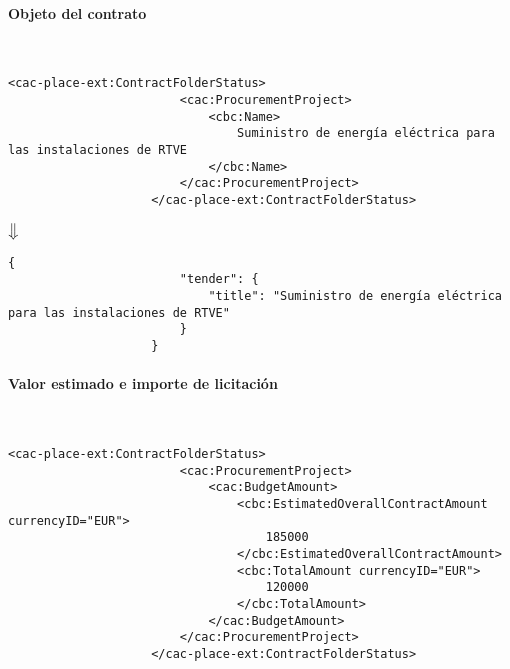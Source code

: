             \paragraph{Objeto del contrato} \mbox{}\\
                \begin{lstlisting}[language=lXML]
                    <cac-place-ext:ContractFolderStatus>
                        <cac:ProcurementProject>
                            <cbc:Name>
                                Suministro de energía eléctrica para las instalaciones de RTVE
                            </cbc:Name>
                        </cac:ProcurementProject>
                    </cac-place-ext:ContractFolderStatus>
                \end{lstlisting}
                
                \begin{center}
                    $\big\Downarrow$
                \end{center}
                
                \begin{lstlisting}[language=lJSON]
                    {
                        "tender": {
                            "title": "Suministro de energía eléctrica para las instalaciones de RTVE"
                        }
                    }
                \end{lstlisting}
                
            \paragraph{Valor estimado e importe de licitación} \mbox{}\\
                \begin{lstlisting}[language=lXML]
                    <cac-place-ext:ContractFolderStatus>
                        <cac:ProcurementProject>
                            <cac:BudgetAmount>
                                <cbc:EstimatedOverallContractAmount currencyID="EUR">
                                    185000
                                </cbc:EstimatedOverallContractAmount>
                                <cbc:TotalAmount currencyID="EUR">
                                    120000
                                </cbc:TotalAmount>
                            </cac:BudgetAmount>
                        </cac:ProcurementProject>
                    </cac-place-ext:ContractFolderStatus>
                \end{lstlisting}
                
